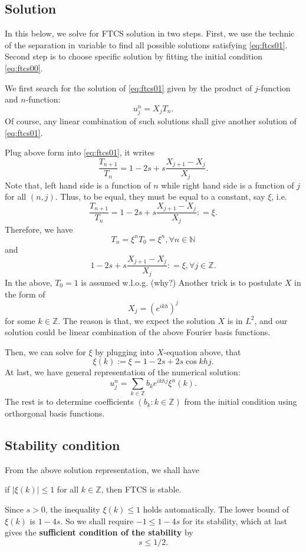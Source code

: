 \documentclass{article}
\begin{document}
\subsection{Solution}

In this below, we solve for FTCS solution in two steps. 
First, we 
use the technic of the separation in variable to 
find all possible
solutions satisfying \eqref{eq:ftcs01}. 
Second step is to choose specific solution by fitting the initial condition \eqref{eq:ftcs00}.

We first search for the solution of \eqref{eq:ftcs01} given by the product of 
$j$-function and $n$-function:
$$u_{j}^{n} = X_{j} T_{n}.$$
Of course, any linear combination of such solutions shall give another solution of \eqref{eq:ftcs01}.

Plug above form into \eqref{eq:ftcs01}, it writes
$$\frac{T_{n+1}}{T_{n}} = 1 - 2s + s \frac{X_{j+1} - X_{j}}{X_{j}}.$$
Note that, left hand side is a function of $n$ while right hand side is a function of $j$ for all $(n, j)$. Thus, to be equal, they must be equal to a constant, say $\xi$, i.e.
$$\frac{T_{n+1}}{T_{n}} = 1 - 2s + s \frac{X_{j+1} - X_{j}}{X_{j}}: = \xi.$$
Therefore, we have 
$$T_{n} = \xi^{n} T_{0} = \xi^{n}, \forall n\in \mathbb N$$
and
$$
1 - 2s + s \frac{X_{j+1} - X_{j}}{X_{j}}: = \xi, \forall j\in \mathbb Z.
$$
In the above, $T_{0} =1$ is assumed w.l.o.g. (why?) Another trick is to postulate $X$ in the form of
$$
X_{j} = (e^{ikh})^{j}
$$
for some $k\in \mathbb Z$. The reason is that, we expect the solution $X$ is in $L^{2}$, and our solution could be linear combination of the above Fourier basis functions.

Then, we can solve for $\xi$ by plugging into $X$-equation above, that
$$
\xi(k) := \xi = 1 - 2s + 2s \cos khj.
$$
At last, we have general representation of the numerical solution:
$$u_{j}^{n} =  \sum_{k\in \mathbb Z} b_{k} e^{ikhj} \xi^{n}(k).$$
The rest is to determine coefficients 
$(b_{k}: k\in \mathbb Z)$ from the initial condition using orthorgonal basis functions. 

\subsection{Stability condition}
From the above solution representation, we shall have 
\begin{center}
if $|\xi(k)| \le 1$ for all $k\in \mathbb Z$, then FTCS is stable.
\end{center}
Since $s>0$, the inequality $\xi(k) \le 1$ holds automatically.
The lower bound of $\xi(k)$ is $1-4s$. So we shall require
$-1 \le 1- 4s $
for its stability, which at last gives the {\bf sufficient condition of the stability} 
by
$$s \le 1/2.$$
\end{document}
